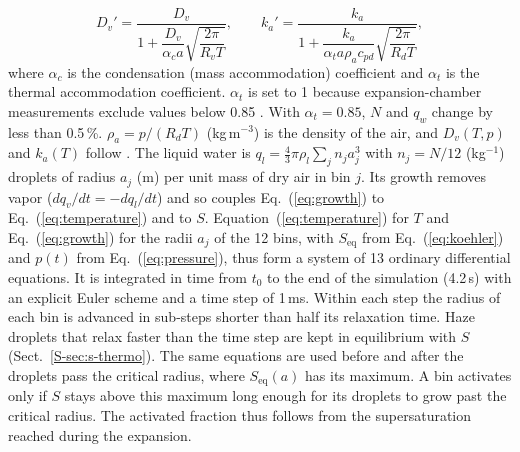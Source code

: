 \documentclass[preprint,review,12pt,authoryear]{elsarticle}
\begin{document}
\begin{equation}
D_v' = \frac{D_v}{1 + \dfrac{D_v}{\alpha_c a}\sqrt{\dfrac{2\pi}{R_v T}}},\qquad
k_a' = \frac{k_a}{1 + \dfrac{k_a}{\alpha_t a \rho_a c_{pd}}\sqrt{\dfrac{2\pi}{R_d T}}},
\label{eq:kinetic}
\end{equation}
where $\alpha_c$ is the condensation (mass accommodation) coefficient and $\alpha_t$ is the thermal
accommodation coefficient. $\alpha_t$ is set to 1 because expansion-chamber
measurements exclude values below 0.85 \citep{winkler2004mass}. With $\alpha_t = 0.85$, $N$ and
$q_w$ change by less than 0.5\,\%.
$\rho_a = p/(R_d T)$ (kg\,m$^{-3}$) is the density of the air, and $D_v(T, p)$ and $k_a(T)$ follow
\citet[Eqs.~13-3 and 13-18a]{pruppacher1997microphysics}.
The liquid water is $q_l = \tfrac{4}{3}\pi\rho_l \sum_j n_j a_j^3$ with $n_j = N/12$ (kg$^{-1}$)
droplets of radius $a_j$ (m) per unit mass of dry air in bin $j$.
Its growth removes vapor ($dq_v/dt = -dq_l/dt$) and so couples Eq.~(\ref{eq:growth}) to
Eq.~(\ref{eq:temperature}) and to $S$. Equation~(\ref{eq:temperature}) for $T$ and
Eq.~(\ref{eq:growth}) for the radii $a_j$ of the 12 bins, with $S_\mathrm{eq}$ from Eq.~(\ref{eq:koehler})
and $p(t)$ from Eq.~(\ref{eq:pressure}), thus form a system of 13 ordinary differential equations.
It is integrated in time from $t_0$ to the end of the simulation (4.2\,s) with an explicit Euler
scheme and a time step of 1\,ms. Within each step the radius of each bin is advanced in sub-steps
shorter than half its relaxation time. Haze droplets that relax faster than the time step are kept in
equilibrium with $S$ (Sect.~\ref{S-sec:s-thermo}). The same equations are used before
and after the droplets pass the critical radius, where $S_\mathrm{eq}(a)$ has its maximum. A bin
activates only if $S$ stays above this maximum long enough for its droplets to grow past the critical
radius. The activated fraction thus follows from the supersaturation reached during the expansion.
\end{document}
